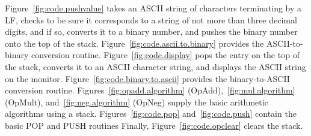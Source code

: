 \documentclass{patt}
\begin{document}
\FloatBarrier

Figure~\ref{fig:code.pushvalue} takes an ASCII string of
characters terminating by a LF, checks to be sure it corresponds to a string
of not more than three decimal digits, and if so, converts it to a binary 
number, and pushes the binary number onto the top of the stack.  
Figure~\ref{fig:code.ascii.to.binary} provides the ASCII-to-binary conversion
routine.  Figure~\ref{fig:code.display} pops the entry on the top of
the stack, converts it to an ASCII character string, and displays the ASCII
string on the monitor.  Figure~\ref{fig:code.binary.to.ascii} provides
the binary-to-ASCII conversion routine.
Figures~\ref{fig:opadd.algorithm} (OpAdd),~\ref{fig:mul.algorithm}
(OpMult), and~\ref{fig:neg.algorithm} (OpNeg) supply the basic
arithmetic algorithms using a stack. Figures~\ref{fig:code.pop}
and~\ref{fig:code.push} contain the basic POP and PUSH routines
Finally, Figure~\ref{fig:code.opclear} clears the stack.

\end{document}
